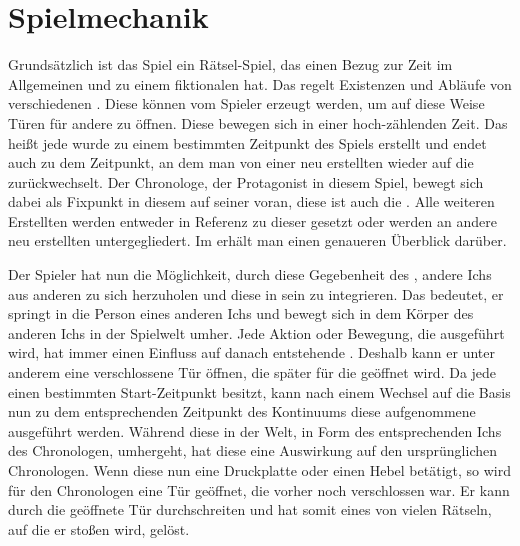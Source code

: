 \section{Spielmechanik}
Grundsätzlich ist das Spiel ein Rätsel-Spiel, das einen Bezug zur Zeit im Allgemeinen und zu einem fiktionalen  hat. Das  regelt Existenzen und Abläufe von verschiedenen . Diese  können vom Spieler erzeugt werden, um auf diese Weise Türen für andere  zu öffnen. Diese  bewegen sich in einer hoch-zählenden Zeit. Das heißt jede  wurde zu einem bestimmten Zeitpunkt des Spiels erstellt und endet auch zu dem Zeitpunkt, an dem man von einer neu erstellten  wieder auf die  zurückwechselt. Der Chronologe, der Protagonist in diesem Spiel, bewegt sich dabei als Fixpunkt in diesem  auf seiner  voran, diese ist auch die . Alle weiteren Erstellten  werden entweder in Referenz zu dieser  gesetzt oder werden an andere neu erstellten  untergegliedert. Im  erhält man einen genaueren Überblick darüber. 

Der Spieler hat nun die Möglichkeit, durch diese Gegebenheit des , andere Ichs aus anderen  zu sich herzuholen und diese in sein  zu integrieren. Das bedeutet, er springt in die Person eines anderen Ichs und bewegt sich in dem Körper des anderen Ichs in der Spielwelt umher. Jede Aktion oder Bewegung, die  ausgeführt wird, hat immer einen Einfluss auf danach entstehende . Deshalb kann er unter anderem eine verschlossene Tür öffnen, die später für die  geöffnet wird. Da jede  einen bestimmten Start-Zeitpunkt besitzt, kann nach einem Wechsel auf die Basis  nun zu dem entsprechenden Zeitpunkt des Kontinuums diese aufgenommene  ausgeführt werden. Während diese  in der Welt, in Form des entsprechenden Ichs des Chronologen, umhergeht, hat diese  eine Auswirkung auf den ursprünglichen Chronologen. Wenn diese  nun eine Druckplatte oder einen Hebel betätigt, so wird für den Chronologen eine Tür geöffnet, die vorher noch verschlossen war. Er kann durch die geöffnete Tür durchschreiten und hat somit eines von vielen Rätseln, auf die er stoßen wird, gelöst.

